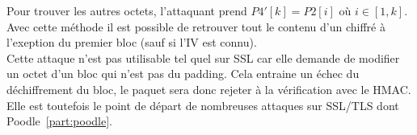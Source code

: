 Pour trouver les autres octets, l'attaquant prend $P4'[k] = P2[i]$ où $i \in [1,k]$.
Avec cette méthode il est possible de retrouver tout le contenu d'un chiffré à
l'exeption du premier bloc (sauf si l'IV est connu).\\

Cette attaque n'est pas utilisable tel quel sur SSL car elle demande de modifier un octet
d'un bloc qui n'est pas du padding. Cela entraine un échec du déchiffrement du bloc, le
paquet sera donc rejeter à la vérification avec le HMAC. Elle est toutefois le point de
départ de nombreuses attaques sur SSL/TLS dont Poodle~\ref{part:poodle}.
